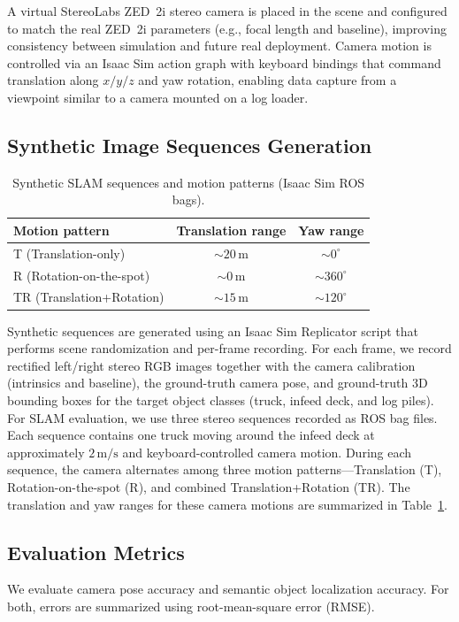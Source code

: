 \documentclass[letterpaper, 10 pt, conference]{IEEEtran}  %
\begin{document}
A virtual StereoLabs ZED~2i stereo camera is placed in the scene and configured to match the real ZED~2i parameters (e.g., focal length and baseline), improving consistency between simulation and future real deployment. Camera motion is controlled via an Isaac Sim action graph with keyboard bindings that command translation along $x/y/z$ and yaw rotation, enabling data capture from a viewpoint similar to a camera mounted on a log loader. 


\subsection{Synthetic Image Sequences Generation}
\begin{table}[h]
\centering
\caption{Synthetic SLAM sequences and motion patterns (Isaac Sim ROS bags).}
\label{tab:slam_sequences}
\setlength{\tabcolsep}{6pt}
\renewcommand{\arraystretch}{1.15}
\begin{tabular}{lcc}
\toprule
\textbf{Motion pattern} & \textbf{Translation range} & \textbf{Yaw range} \\
\midrule
T (Translation-only) & $\sim 20\,\mathrm{m}$ & $\sim 0^\circ$ \\
R (Rotation-on-the-spot) & $\sim 0\,\mathrm{m}$ & $\sim 360^\circ$ \\
TR (Translation+Rotation) & $\sim 15\,\mathrm{m}$ & $\sim 120^\circ$ \\
\bottomrule
\end{tabular}
\vspace{0.3em}
\end{table}

Synthetic sequences are generated using an Isaac Sim Replicator script that performs scene randomization and per-frame recording. For each frame, we record rectified left/right stereo RGB images together with the camera calibration (intrinsics and baseline), the ground-truth camera pose, and ground-truth 3D bounding boxes for the target object classes (truck, infeed deck, and log piles). For SLAM evaluation, we use three stereo sequences recorded as ROS bag files. Each sequence contains one truck moving around the infeed deck at approximately $2\,\mathrm{m/s}$ and keyboard-controlled camera motion. During each sequence, the camera alternates among three motion patterns---Translation (T), Rotation-on-the-spot (R), and combined Translation+Rotation (TR). The translation and yaw ranges for these camera motions are summarized in Table~\ref{tab:slam_sequences}.


\subsection{Evaluation Metrics}
We evaluate camera pose accuracy and semantic object localization accuracy. For both, errors are summarized using root-mean-square error (RMSE). 
\end{document}
